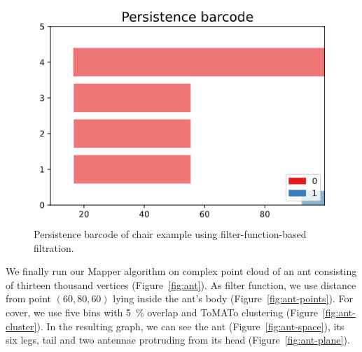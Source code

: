 \documentclass{article}
\begin{document}
\begin{figure}[ht]
    \centering
    \includegraphics[width=0.5\columnwidth]{chair-barcode}
    \caption{Persistence barcode of chair example using filter-function-based filtration.}
    \label{fig:chair-persistence}
\end{figure}

We finally run our Mapper algorithm on complex point cloud of an ant consisting
of thirteen thousand vertices (Figure~\ref{fig:ant}). As filter function, we use
distance from point $(60, 80, 60)$ lying inside the ant's body
(Figure~\ref{fig:ant-points}). For cover, we use five bins with 5~\% overlap and
ToMATo clustering (Figure~\ref{fig:ant-cluster}). In the resulting graph, we can
see the ant (Figure~\ref{fig:ant-space}), its six legs, tail and two antennae protruding from its head
(Figure~\ref{fig:ant-plane}).
\end{document}
